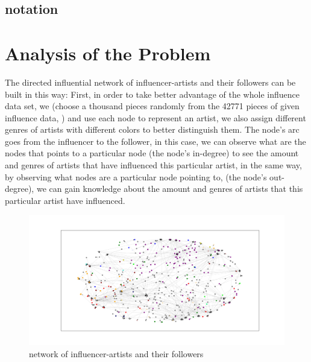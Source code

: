 \documentclass[12pt]{article}
\begin{document}
\subsection{notation}

\section{Analysis of the Problem}
The directed influential network of influencer-artists and their followers can be built in this way: First, in order to take better advantage of the whole influence data set, we (choose a thousand pieces randomly from the 42771 pieces of given influence data, ) and use each node to represent an artist, we also assign different genres of artists with different colors to better distinguish them. The node's arc goes from the influencer to the follower, in this case, we can observe what are the nodes that points to a particular node (the node's in-degree) to see the amount and genres of artists that have influenced this particular artist, in the same way, by observing what nodes are a particular node pointing to, (the node's out-degree), we can gain knowledge about the amount and genres of artists that this particular artist have influenced.
\begin{figure}[h]
\small
\flushleft
\includegraphics[width=19cm]{firstmodel.png}
\caption{network of influencer-artists and their followers}
\end{figure}
\end{document}
